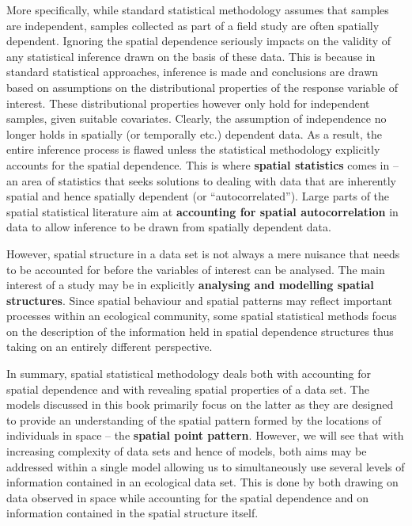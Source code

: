 More specifically, while standard statistical methodology assumes that samples are independent, samples collected as part of a field study are often spatially dependent. Ignoring the spatial dependence seriously impacts on the validity of any statistical inference drawn on the basis of  these data. This is because in standard statistical approaches, inference is made and conclusions are drawn based on assumptions on the distributional properties of the response variable of interest. These distributional properties however only hold for independent samples, given suitable covariates. Clearly, the assumption of independence no longer holds in spatially (or temporally etc.) dependent data. As a result, the entire inference process is flawed unless the statistical methodology explicitly accounts for the spatial dependence.  This is where \textbf{spatial statistics} comes in -- an area of statistics that seeks solutions to dealing with data that are inherently spatial and hence spatially dependent (or ``autocorrelated'').  Large parts of the spatial statistical literature aim at \textbf{accounting for spatial autocorrelation} in data to allow inference to be drawn from spatially dependent data.

However, spatial structure in a data set is not always a mere nuisance that needs to be accounted for before the variables of interest can be analysed. The main interest of a study may be in explicitly \textbf{analysing and modelling spatial structures}. Since spatial behaviour and spatial patterns may reflect important processes within an ecological community, some spatial statistical methods focus on the description of the information held in spatial dependence structures thus taking on an entirely different perspective.

In summary, spatial statistical methodology deals both with accounting for spatial dependence and with revealing spatial properties of a data set.  The models discussed in this book primarily focus on the latter as they are designed to provide an understanding of the spatial pattern formed by the locations of individuals in space -- the \textbf{spatial point pattern}. However, we will see that with increasing complexity of data sets and hence of models, both aims may be addressed within a single model allowing us to simultaneously use several levels of information contained in an ecological data set. This is done by both drawing on data observed in space while accounting for the spatial dependence and on information contained in the spatial structure itself.

